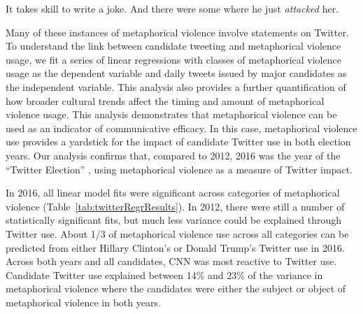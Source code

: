 \begin{exe}
  \ex It takes skill to write a joke. And there were some where he just \emph{attacked} her.
\end{exe}

Many of these instances of metaphorical violence involve statements on Twitter. 
To understand the link between candidate tweeting and metaphorical violence usage,
we fit a series of linear regressions with classes of metaphorical violence
usage as the dependent variable and daily tweets issued by major candidates 
as the independent variable.  This analysis also provides a further quantification of how 
broader cultural trends affect the timing and amount of metaphorical violence
usage. This analysis demonstrates that metaphorical violence can be used as an
indicator of communicative efficacy. In this case, metaphorical violence use
provides a yardstick for the
impact of candidate Twitter use in both election years. Our
analysis confirms that, compared to 2012, 2016 was the year of the ``Twitter Election''
\cite{Heller2016}, using metaphorical violence as a measure of Twitter
impact. 

In 2016, all linear model fits were significant across categories of 
metaphorical violence (Table~\ref{tab:twitterRegrResults}). In 2012, there
were still a number of statistically significant fits, but much less variance
could be explained through Twitter use. About 1/3 of metaphorical violence use across all
categories can be predicted from either Hillary Clinton's or Donald Trump's
Twitter use in 2016. Across both years and all candidates, 
CNN was most reactive to Twitter use. Candidate Twitter use explained between
14\% and 23\% of the variance
in metaphorical violence where the candidates were either the subject or object
of metaphorical violence in both years. 

  \begin{table}
    \centering
    \vspace{.45in}
    
    \caption{Regression coefficients, %
      and significance indicators for
      linear models of metaphorical violence usage as a function of the number of
      tweets from individual candidates. The regression
      coefficient represents the additional metaphorical violence uses that 
      occur with each message the candidate tweets. %
      of variance that is represented through a linear relationship with candidate
      tweets. The 2016 candidates's Twitter use had a greater impact on metaphorical
      violence usage than the 2012 candidates's. In both years, Twitter use 
      had a strong effect on metaphorical violence use where the tweeting candidate was
      cast as the subject of metaphorical violence, or where the other candidate
      was the object of metaphorical violence.}
    \label{tab:twitterRegrResults}
    \vspace{.25in}
  \end{table}

